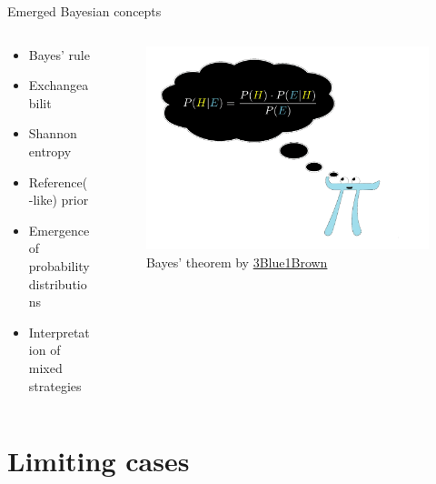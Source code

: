 \documentclass{beamer}
\theoremstyle{definition}
\begin{document}
\begin{frame}{Emerged Bayesian concepts}


\begin{columns}

\begin{column}{0.5\textwidth}
            
\begin{itemize}
    \item Bayes' rule 
    \item Exchangeabilit
    \item Shannon entropy
    \item Reference(-like) prior
    \item Emergence of probability distributions
    \item Interpretation of mixed strategies
\end{itemize}
        \end{column}

\begin{column}{0.5\textwidth}
    \begin{figure}
    \centering
        \includegraphics[width=\textwidth]{img/BlueBayes.png}
        \caption{\small \centering  Bayes' theorem by \href{https://www.3blue1brown.com/lessons/bayes-theorem}{3Blue1Brown}}
    \end{figure}
\end{column}
        

\end{columns}


\end{frame}

\section{Limiting cases}
\end{document}
